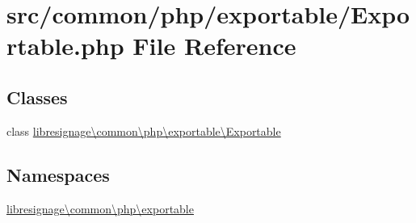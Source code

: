 \hypertarget{Exportable_8php}{}\section{src/common/php/exportable/\+Exportable.php File Reference}
\label{Exportable_8php}
\subsection*{Classes}
\begin{DoxyCompactItemize}
\item 
class \hyperlink{classlibresignage_1_1common_1_1php_1_1exportable_1_1Exportable}{libresignage\textbackslash{}common\textbackslash{}php\textbackslash{}exportable\textbackslash{}\+Exportable}
\end{DoxyCompactItemize}
\subsection*{Namespaces}
\begin{DoxyCompactItemize}
\item 
 \hyperlink{namespacelibresignage_1_1common_1_1php_1_1exportable}{libresignage\textbackslash{}common\textbackslash{}php\textbackslash{}exportable}
\end{DoxyCompactItemize}
